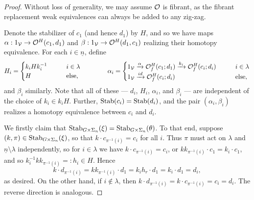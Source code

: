 \documentclass[a4paper,10pt
,draft
]{article}%
\renewcommand{\1}{\ensuremath{\mathbb{id}}}
\begin{document}
\begin{proof}
      Without loss of generality, we may assume $\mathcal{O}$ is fibrant,
      as the fibrant replacement weak equivalences can always be added to any zig-zag.

      Denote the stabilizer of $c_1$ (and hence $d_1$) by $H$, and so we have maps
      $\alpha: 1_{\mathcal V} \to \mathcal{O}^H(c_1,d_1)$ and $\beta: 1_{\mathcal V} \to \mathcal{O}^H(d_1,c_1)$
      realizing their homotopy equivalence.
      For each $i \in \underline{n}$, define
      \begin{equation}
            \label{WEAKEQCOLORS_EQ}
            H_i =
            \begin{cases}
                  k_i H k_i^{-1} \qquad & i \in \lambda
                  \\
                  H & \mbox{else,}
            \end{cases}
            \qquad
            \qquad 
            \alpha_i =
            \begin{cases}
                  1_{\mathcal V} \xrightarrow{\alpha} \mathcal{O}^H_f(c_1;d_1) \xrightarrow{k_i} \mathcal{O}^H_f(c_i;d_i) \qquad & i \in \lambda
                  \\
                  1_{\mathcal V} \xrightarrow{id} \mathcal{O}^H_f(c_i;d_i) & \mbox{else},
            \end{cases}
      \end{equation}
      and $\beta_i$ similarly.
      Note that all of these --- $d_i$, $H_i$, $\alpha_i$, and $\beta_i$ --- are independent of the choice of $k_i\in k_i H$.
      Further, $\mathrm{Stab}(c_i) = \mathrm{Stab}(d_i)$, and
      the pair $(\alpha_i,\beta_i)$ realizes a homotopy equivalence between $c_i$ and $d_i$.

      We firstly claim that $\mathrm{Stab}_{G \times \Sigma_n}(\xi) = \mathrm{Stab}_{G \times \Sigma_n}(\theta)$.
      To that end, suppose $(k,\pi)\in \mathrm{Stab}_{G\times \Sigma_n}(\xi)$, so that $k \cdot c_{\pi^{-1}(i)} = c_i$ for all $i$.
      Thus $\pi$ must act on $\lambda$ and $\underline{n} \setminus \lambda$ independently,
      so for $i \in \lambda$ we have $k \cdot c_{\pi^{-1}(i)} = c_i$, or
      $k k_{\pi^{-1}(i)} \cdot c_1 = k_i \cdot c_1$, and so
      $k_i^{-1} k k_{\pi^{-1}(i)} =:h_i \in H$. Hence 
      \begin{equation}
            k \cdot d_{\pi^{-1}(i)} = k k_{\pi^{-1}(i)} \cdot d_1 = k_i h_r \cdot d_1 = k_i \cdot d_1 = d_i,
      \end{equation}
      as desired.
      On the other hand, if $i \not \in \lambda$, then
      $k \cdot d_{\pi^{-1}(i)} = k \cdot c_{\pi^{-1}(i)} = c_i = d_i$.
      The reverse direction is analogous.
      

\end{proof}
\end{document}
